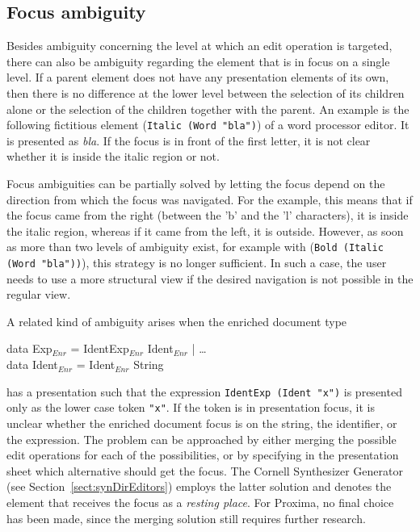 %																
\subsection{Focus ambiguity}

Besides ambiguity concerning the level at which an edit operation is targeted, there can also be  ambiguity regarding the element that is in focus on a single level. If a parent element does not have any presentation elements of its own, then there is no difference at the lower level between the selection of its children alone or the selection of the children together with the parent. An example is the following fictitious element (\verb|Italic (Word "bla")|) of a word processor editor. It is presented as {\it bla}. If the focus is in front of the first letter, it is not clear whether it is inside the italic region or not. 

Focus ambiguities can be partially solved by letting the focus depend on the direction from which the focus was navigated. For the example, this means that if the focus came from the right (between the 'b' and the 'l' characters), it is inside the italic region, whereas if it came from the left, it is outside. However, as soon as more than two levels of ambiguity exist, for example with (\verb|Bold (Italic (Word "bla"))|), this strategy is no longer sufficient. In such a case, the user needs to use a more structural view if the desired navigation is not possible in the regular view.


A related kind of ambiguity arises when the enriched document type

\small \ttfamily
\begin{tabbing}
data Exp$_{Enr}$ = IdentExp$_{Enr}$ Ident$_{Enr}$ | \dots \\
data Ident$_{Enr}$ = Ident$_{Enr}$ String
\end{tabbing}
\rmfamily \normalsize

has a presentation such that the expression \verb|IdentExp (Ident "x")| is presented only as the lower case token \verb|"x"|. If the token is in presentation focus, it is unclear whether the enriched document focus is on the string, the identifier, or the expression. The problem can be approached by either merging the possible edit operations for each of the possibilities, or by specifying in the presentation sheet which alternative should get the focus. The Cornell Synthesizer Generator (see Section~\ref{sect:synDirEditors}) employs the latter solution and denotes the element that receives the focus as a {\em resting place}. For Proxima, no final choice has been made, since the merging solution still requires further research.

